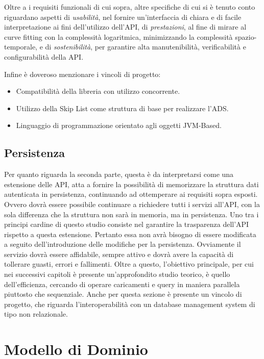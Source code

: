 	Oltre a i requisiti funzionali di cui sopra, altre specifiche di cui si è tenuto conto riguardano aspetti di \textit{usabilità}, nel fornire un'interfaccia di chiara e di facile interpretazione ai fini dell'utilizzo dell'API, di \textit{prestazioni}, al fine di mirare al curve fitting con la complessità logaritmica, minimizzando la complessità spazio-temporale, e di \textit{sostenibilità}, per garantire alta manutenibilità, verificabilità e configurabilità della API.
	
	Infine è doveroso menzionare i vincoli di progetto:
	\begin{itemize}
		\item Compatibilità della libreria con utilizzo concorrente.
		\item Utilizzo della Skip List come struttura di base per realizzare l'ADS.
		\item Linguaggio di programmazione orientato agli oggetti JVM-Based.
	\end{itemize}

	\subsection{Persistenza}
	
	Per quanto riguarda la seconda parte, questa è da interpretarsi come una estensione delle API, atta a fornire la possibilità di memorizzare la struttura dati autenticata in persistenza, continuando ad ottemperare ai requisiti sopra esposti. Ovvero dovrà essere possibile continuare a richiedere tutti i servizi all'API, con la sola differenza che la struttura non sarà in memoria, ma in persistenza. Uno tra i principi cardine di questo studio consiste nel garantire la trasparenza dell'API rispetto a questa estensione. Pertanto essa non avrà bisogno di essere modificata a seguito dell'introduzione delle modifiche per la persistenza. Ovviamente il servizio dovrà essere affidabile, sempre attivo e dovrà avere la capacità di tollerare guasti, errori e fallimenti.
	Oltre a questo, l'obiettivo principale, per cui nei successivi capitoli è presente un'approfondito studio teorico, è quello dell'efficienza, cercando di operare caricamenti e query in maniera parallela piuttosto che sequenziale.
	Anche per questa sezione è presente un vincolo di progetto, che riguarda l'interoperabilità con un database management system di tipo non relazionale.

\section{Modello di Dominio}

